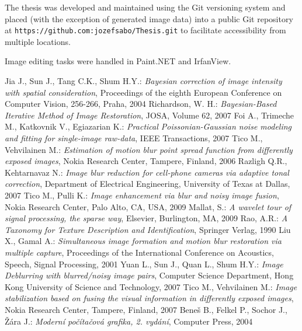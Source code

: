 \documentclass[12pt,notitlepage]{report}
\begin{document}
The thesis was developed and maintained using the Git versioning system and placed (with the exception of generated image data) into a public Git repository at \texttt{https://github.com:jozefsabo/Thesis.git} to facilitate accessibility from multiple locations.

Image editing tasks were handled in Paint.NET and IrfanView.


\begin{thebibliography}{xxxxx-99}
 Jia J., Sun J., Tang C.K., Shum H.Y.: {\em Bayesian correction of image intensity with spatial consideration}, Proceedings of the eighth European Conference on Computer Vision, 256-266, Praha, 2004
 Richardson, W. H.: {\em Bayesian-Based Iterative Method of Image Restoration}, JOSA, Volume 62, 2007
 Foi A., Trimeche M., Katkovnik V., Egiazarian K.: {\em Practical Poissonian-Gaussian noise modeling and fitting for single-image raw-data}, IEEE Transactions, 2007
 Tico M., Vehvilainen M.: {\em  Estimation of motion blur point spread function from differently exposed images}, Nokia Research Center, Tampere, Finland, 2006
 Razligh Q.R., Kehtarnavaz N.: {\em Image blur reduction for cell-phone cameras via adaptive tonal correction}, Department of Electrical Engineering, University of Texas at Dallas, 2007
 Tico M., Pulli K.: {\em Image enhancement via blur and noisy image fusion}, Nokia Research Center, Palo Alto, CA, USA, 2009
 Mallat, S.: {\em A wavelet tour of signal processing, the sparse way}, Elsevier, Burlington, MA, 2009
 Rao, A.R.: {\em A Taxonomy for Texture Description and Identification}, Springer Verlag, 1990
 Liu X., Gamal A.: {\em Simultaneous image formation and motion blur restoration via multiple capture}, Proceedings of the International Conference on Acoustics, Speech, Signal Processing, 2001
 Yuan L., Sun J., Quan L., Shum H.Y.: {\em Image Deblurring with blurred/noisy image pairs},  Computer Science Department, Hong Kong University of Science and Technology, 2007
 Tico M., Vehvilainen M.: {\em Image stabilization based on fusing the visual information in differently exposed images}, Nokia Research Center, Tampere, Finland, 2007
 Beneš B., Felkel P., Sochor J., Žára J.: {\em Moderní počítačová grafika, 2. vydání}, Computer Press, 2004

\end{thebibliography}
\end{document}
